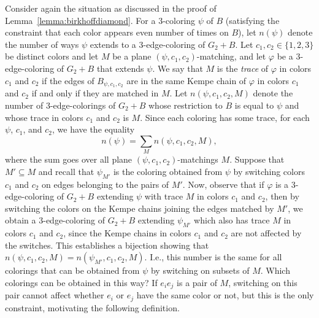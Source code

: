 \documentclass[12pt,twoside,openright,a4paper]{book}
\begin{document}
Consider again the situation as discussed in the proof of Lemma~\ref{lemma:birkhoffdiamond}.  For a $3$-coloring $\psi$ of $B$
(satisfying the constraint that each color appears even number of times on $B$), let $n(\psi)$ denote the number of ways
$\psi$ extends to a $3$-edge-coloring of $G_2+B$.  Let $c_1,c_2\in \{1,2,3\}$ be distinct colors and let $M$ be a plane $(\psi,c_1,c_2)$-matching,
and let $\varphi$ be a $3$-edge-coloring of $G_2+B$ that extends $\psi$.  We say that $M$ is the \emph{trace} of $\varphi$ in colors $c_1$ and $c_2$
if the edges of $B_{\psi,c_1,c_2}$ are in the same Kempe chain of $\varphi$ in colors $c_1$ and $c_2$ if and only if they are matched in $M$.
Let $n(\psi,c_1,c_2,M)$ denote the number of $3$-edge-colorings of $G_2+B$ whose restriction to $B$ is equal to $\psi$ and whose trace in colors $c_1$ and $c_2$ is $M$.
Since each coloring has some trace, for each $\psi$, $c_1$, and $c_2$, we have the equality
$$n(\psi)=\sum_M n(\psi,c_1,c_2, M),$$
where the sum goes over all plane $(\psi,c_1,c_2)$-matchings $M$.  Suppose that $M'\subseteq M$ and recall that $\psi_{M'}$ is the coloring
obtained from $\psi$ by switching colors $c_1$ and $c_2$ on edges belonging to the pairs of $M'$.  Now, observe that if $\varphi$ is
a $3$-edge-coloring of $G_2+B$ extending $\psi$ with trace $M$ in colors $c_1$ and $c_2$, then by switching the colors on the Kempe chains joining the edges
matched by $M'$, we obtain a $3$-edge-coloring of $G_2+B$ extending $\psi_{M'}$ which also has trace $M$ in colors $c_1$ and $c_2$, since the Kempe chains in colors $c_1$ and $c_2$
are not affected by the switches.  This establishes a bijection showing that $n(\psi,c_1,c_2,M)=n(\psi_{M'},c_1,c_2,M)$.  I.e., this number is the same for all
colorings that can be obtained from $\psi$ by switching on subsets of $M$.  Which colorings can be obtained in this way?  If $e_ie_j$ is a pair of $M$,
switching on this pair cannot affect whether $e_i$ or $e_j$ have the same color or not, but this is the only constraint, motivating the following definition.
\end{document}
